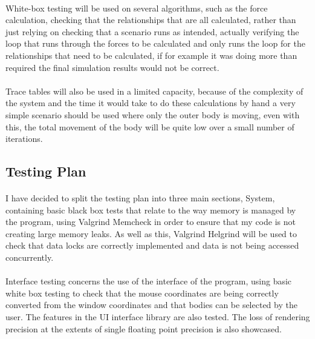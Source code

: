 \paragraph{}
White-box testing will be used on several algorithms, such as the force calculation, checking that the relationships that are all calculated, rather than just relying on checking that a scenario runs as intended, actually verifying the loop that runs through the forces to be calculated and only runs the loop for the relationships that need to be calculated, if for example it was doing more than required the final simulation results would not be correct.

\paragraph{}
Trace tables will also be used in a limited capacity, because of the complexity of the system and the time it would take to do these calculations by hand a very simple scenario should be used where only the outer body is moving, even with this, the total movement of the body will be quite low over a small number of iterations.

\pagebreak
\subsection{Testing Plan}
\paragraph{}
I have decided to split the testing plan into three main sections, System, containing basic black box tests that relate to the way memory is managed by the program, using Valgrind Memcheck in order to ensure that my code is not creating large memory leaks. As well as this, Valgrind Helgrind will be used to check that data locks are correctly implemented and data is not being accessed concurrently.

\paragraph{}
Interface testing concerns the use of the interface of the program, using basic white box testing to check that the mouse coordinates are being correctly converted from the window coordinates and that bodies can be selected by the user. The features in the UI interface library are also tested. The loss of rendering precision at the extents of single floating point precision is also showcased.

